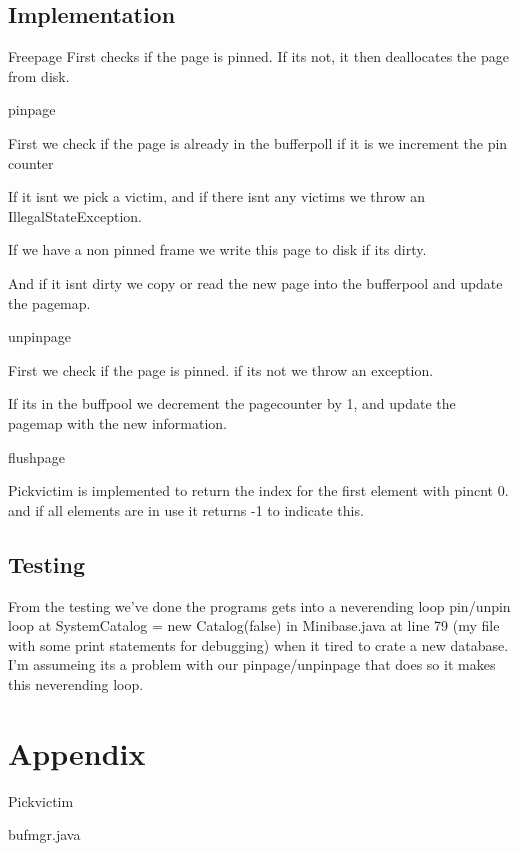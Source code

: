 \documentclass[a4paper,10pt,titlepage]{report}
\begin{document}
\subsection{Implementation}
Freepage First checks if the page is pinned. If its not, it then deallocates the page from disk.

\vspace{10mm}
pinpage

First we check if the page is already in the bufferpoll if it is we increment the pin counter

If it isnt we pick a victim, and if there isnt any victims we throw an IllegalStateException.

If we have a non pinned frame we write this page to disk if its dirty.

And if it isnt dirty we  copy or read the new page into the bufferpool and update the pagemap.

\vspace{10mm}
unpinpage

First we check if the page is pinned. if its not we throw an exception.

If its in the buffpool we decrement the pagecounter by 1, and update the pagemap with the new information.

\vspace{10mm}
flushpage

\vspace{10mm}

Pickvictim is implemented to return the index for the first element with pincnt 0. and if all elements are in use it returns -1 to indicate this.


\subsection{Testing}
From the testing we've done the programs gets into a neverending loop pin/unpin loop at SystemCatalog = new Catalog(false) in Minibase.java at line 79 (my file with some print statements for debugging) when it tired to crate a new database.\\

I'm assumeing its a problem with our pinpage/unpinpage that does so it makes this neverending loop.

\section{Appendix}
Pickvictim


bufmgr.java

\end{document}
